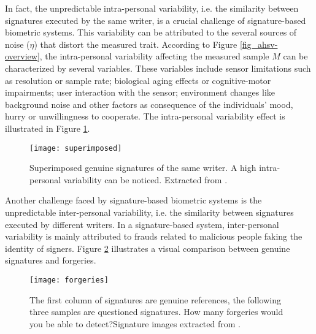 In fact, the unpredictable intra-personal variability, i.e. the similarity between signatures executed by the same writer, is a crucial challenge of signature-based biometric systems. This variability can be attributed to the several sources of noise ($\eta$) that distort the measured trait. According to Figure \ref{fig_ahsv-overview}, the intra-personal variability affecting the measured sample {\boldm $M$} can be characterized by several variables. These variables include sensor limitations such as resolution or sample rate; biological aging effects or cognitive-motor impairments; user interaction with the sensor; environment changes like background noise and other factors as consequence of the individuals’ mood, hurry or unwillingness to cooperate. The intra-personal variability effect is illustrated in Figure \ref{fig:intraclass}.

\begin{figure}[!h]
\centering
\texttt{[image: superimposed]}
\caption{Superimposed genuine signatures of the same writer. A high intra-personal variability can be noticed. Extracted from \cite{hafemann2015offline}. }
\label{fig:intraclass}
\end{figure}


Another challenge faced by signature-based biometric systems is the unpredictable inter-personal variability, i.e. the similarity between signatures executed by different writers. In a signature-based system, inter-personal variability is mainly attributed to frauds related to malicious people faking the identity of signers. Figure \ref{fig_forgeries} illustrates a visual comparison between genuine signatures and forgeries. 

\begin{figure}[!htb]
\centering
\texttt{[image: forgeries]}
\caption[The first column of signatures are genuine references, the following three samples are questioned signatures. How many forgeries would you be able to detect? Signature images extracted from \cite{mcyt-100}.]{The first column of signatures are genuine references, the following three samples are questioned signatures. How many forgeries would you be able to detect?\protect\footnotemark Signature images extracted from \cite{mcyt-100}.} 
\label{fig_forgeries}

\end{figure}


